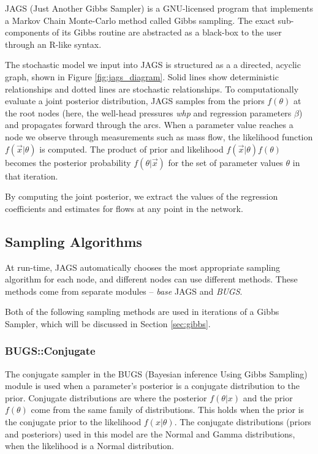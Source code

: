 \documentclass[a4paper, 12pt]{article}
\begin{document}
JAGS (Just Another Gibbs Sampler) is a GNU-licensed program that implements a Markov Chain Monte-Carlo method called Gibbs sampling. The exact sub-components of its Gibbs routine are abstracted as a black-box to the user through an R-like syntax.

The stochastic model we input into JAGS is structured as a a directed, acyclic graph, shown in Figure \ref{fig:jags_diagram}. Solid lines show deterministic relationships and dotted lines are stochastic relationships. To computationally evaluate a joint posterior distribution, JAGS samples from the priors $f(\theta)$ at the root nodes (here, the well-head pressures \emph{whp} and regression parameters $\beta$) and propagates forward through the arcs. When a parameter value reaches a node we observe through measurements such as mass flow, the likelihood function $f(\vec{x}|\theta)$ is computed. The product of prior and likelihood $f(\vec{x}|\theta)f(\theta)$ becomes the posterior probability $f(\theta|\vec{x})$ for the set of parameter values $\theta$ in that iteration.

By computing the joint posterior, we extract the values of the regression coefficients and estimates for flows at any point in the network.

\subsection{Sampling Algorithms}
At run-time, JAGS automatically chooses the most appropriate sampling algorithm for each node, and different nodes can use different methods. These methods come from separate modules -- \emph{base} JAGS and \emph{BUGS}.

Both of the following sampling methods are used in iterations of a Gibbs Sampler, which will be discussed in Section \ref{sec:gibbs}.

\subsubsection{BUGS::Conjugate}
The conjugate sampler in the BUGS (Bayesian inference Using Gibbs Sampling) module is used when a parameter's posterior is a conjugate distribution to the prior. Conjugate distributions are where the posterior $f(\theta|x)$ and the prior $f(\theta)$ come from the same family of distributions. This holds when the prior is the conjugate prior to the likelihood $f(x|\theta)$. The conjugate distributions (priors and posteriors) used in this model are the Normal and Gamma distributions, when the likelihood is a Normal distribution.
\end{document}
